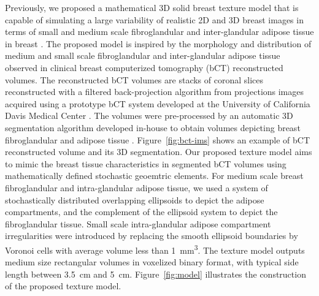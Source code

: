 \documentclass[journal]{IEEEtran}
\begin{document}
Previously, we proposed a mathematical 3D solid breast texture model
that is capable of simulating a large variability of realistic 2D and
3D breast images in terms of small and medium scale fibroglandular and
inter-glandular adipose tissue in breast \cite{li2016novel}. The
proposed model is inspired by the morphology and distribution of
medium and small scale fibroglandular and inter-glandular adipose
tissue observed in clinical breast computerized tomography (bCT)
reconstructed volumes. The reconstructed bCT volumes are stacks of
coronal slices reconstructed with a filtered back-projection algorithm
from projections images acquired using a prototype bCT system
developed at the University of California Davis Medical Center
\cite{lindfors2008dedicated}. The volumes were pre-processed by an
automatic 3D segmentation algorithm developed in-house to obtain
volumes depicting breast fibroglandular and adipose tissue
\cite{thomas2015segmentation}. Figure~\ref{fig:bct-ims} shows an
example of bCT reconstructed volume and its 3D segmentation. Our
proposed texture model aims to mimic the breast tissue characteristics
in segmented bCT volumes using mathematically defined stochastic
geoemtric elements.  For medium scale breast fibroglandular and
intra-glandular adipose tissue, we used a system of stochastically
distributed overlapping ellipsoids to depict the adipose compartments,
and the complement of the ellipsoid system to depict the
fibroglandular tissue. Small scale intra-glandular adipose compartment
irregularities were introduced by replacing the smooth ellipsoid
boundaries by Voronoi cells with average volume less than
\SI{1}{\mm\cubed}. The texture model outputs medium size rectangular
volumes in voxelized binary format, with typical side length between
\SI{3.5}{\cm} and \SI{5}{\cm}. Figure~\ref{fig:model} illustrates the
construction of the proposed texture model.
\end{document}
